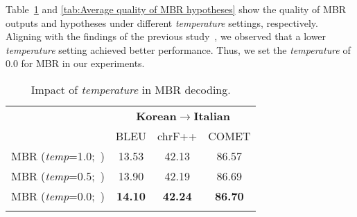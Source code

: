 Table~\ref{tab:Impact of temperature in MBR decoding} and \ref{tab:Average quality of MBR hypotheses} show the quality of MBR outputs and hypotheses under different \textit{temperature} settings, respectively.
Aligning with the findings of the previous study~\cite{peng2023making}, we observed that a lower \textit{temperature} setting achieved better performance.
Thus, we set the \textit{temperature} of 0.0 for MBR in our experiments.


\begin{table}[h]
\centering
\renewcommand{\arraystretch}{1.1}
\begin{adjustbox}{width=\columnwidth, center}
\begin{tabular}{lccc}
\Xhline{3\arrayrulewidth}

\multirow{2}{*}{\textbf{Method}}  & \multicolumn{3}{c}{\textbf{Korean$\rightarrow$Italian}}\\ \cline{2-4}
 & BLEU & chrF++ & COMET \\ \hline\hline 
                  
 MBR (\textit{temp}=1.0;~\citet{mbr})   & 13.53 & 42.13 & 86.57 \\
 MBR (\textit{temp}=0.5;~\citet{temp0.5}) & 13.90 & 42.19 & 86.69 \\  
 MBR (\textit{temp}=0.0;~\citet{peng2023making})   & \textbf{14.10} & \textbf{42.24} & \textbf{86.70} \\ 

\Xhline{3\arrayrulewidth}
\end{tabular}
\end{adjustbox}
\caption{Impact of \textit{temperature} in MBR decoding.}
\label{tab:Impact of temperature in MBR decoding}
\end{table}



